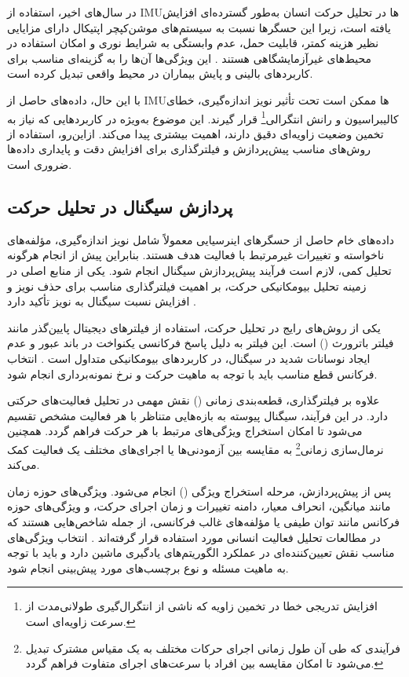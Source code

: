 در سال‌های اخیر، استفاده از IMUها در تحلیل حرکت انسان به‌طور گسترده‌ای افزایش یافته است، زیرا این حسگرها نسبت به سیستم‌های موشن‌کپچر اپتیکال دارای مزایایی نظیر هزینه کمتر، قابلیت حمل، عدم وابستگی به شرایط نوری و امکان استفاده در محیط‌های غیرآزمایشگاهی هستند \cite{MuroDeLaHerran2014Wearable}. این ویژگی‌ها آن‌ها را به گزینه‌ای مناسب برای کاربردهای بالینی و پایش بیماران در محیط واقعی تبدیل کرده است.

با این حال، داده‌های حاصل از IMUها ممکن است تحت تأثیر نویز اندازه‌گیری، خطای کالیبراسیون و رانش انتگرالی\footnote{افزایش تدریجی خطا در تخمین زاویه که ناشی از انتگرال‌گیری طولانی‌مدت از سرعت زاویه‌ای است.} قرار گیرند. این موضوع به‌ویژه در کاربردهایی که نیاز به تخمین وضعیت زاویه‌ای دقیق دارند، اهمیت بیشتری پیدا می‌کند. ازاین‌رو، استفاده از روش‌های مناسب پیش‌پردازش و فیلترگذاری برای افزایش دقت و پایداری داده‌ها ضروری است.

\subsection{پردازش سیگنال در تحلیل حرکت}

داده‌های خام حاصل از حسگرهای اینرسیایی معمولاً شامل نویز اندازه‌گیری، مؤلفه‌های ناخواسته و تغییرات غیرمرتبط با فعالیت هدف هستند. بنابراین پیش از انجام هرگونه تحلیل کمی، لازم است فرآیند پیش‌پردازش سیگنال انجام شود. یکی از منابع اصلی در زمینه تحلیل بیومکانیکی حرکت، بر اهمیت فیلترگذاری مناسب برای حذف نویز و افزایش نسبت سیگنال به نویز تأکید دارد \cite{Winter2009Biomechanics}.

یکی از روش‌های رایج در تحلیل حرکت، استفاده از فیلترهای دیجیتال پایین‌گذر مانند فیلتر باترورث () است. این فیلتر به دلیل پاسخ فرکانسی یکنواخت در باند عبور و عدم ایجاد نوسانات شدید در سیگنال، در کاربردهای بیومکانیکی متداول است \cite{Winter2009Biomechanics}. انتخاب فرکانس قطع مناسب باید با توجه به ماهیت حرکت و نرخ نمونه‌برداری انجام شود.

علاوه بر فیلترگذاری، قطعه‌بندی زمانی () نقش مهمی در تحلیل فعالیت‌های حرکتی دارد. در این فرآیند، سیگنال پیوسته به بازه‌هایی متناظر با هر فعالیت مشخص تقسیم می‌شود تا امکان استخراج ویژگی‌های مرتبط با هر حرکت فراهم گردد. همچنین نرمال‌سازی زمانی\footnote{فرآیندی که طی آن طول زمانی اجرای حرکات مختلف به یک مقیاس مشترک تبدیل می‌شود تا امکان مقایسه بین افراد با سرعت‌های اجرای متفاوت فراهم گردد.} به مقایسه بین آزمودنی‌ها یا اجرای‌های مختلف یک فعالیت کمک می‌کند.

پس از پیش‌پردازش، مرحله استخراج ویژگی () انجام می‌شود. ویژگی‌های حوزه زمان مانند میانگین، انحراف معیار، دامنه تغییرات و زمان اجرای حرکت، و ویژگی‌های حوزه فرکانس مانند توان طیفی یا مؤلفه‌های غالب فرکانسی، از جمله شاخص‌هایی هستند که در مطالعات تحلیل فعالیت انسانی مورد استفاده قرار گرفته‌اند \cite{Bulling2014HumanActivity}. انتخاب ویژگی‌های مناسب نقش تعیین‌کننده‌ای در عملکرد الگوریتم‌های یادگیری ماشین دارد و باید با توجه به ماهیت مسئله و نوع برچسب‌های مورد پیش‌بینی انجام شود.

